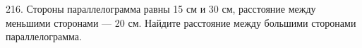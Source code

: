 216. Стороны параллелограмма равны 15 см и 30 см, расстояние между меньшими сторонами --- 20 см. Найдите расстояние между большими сторонами параллелограмма.\\
